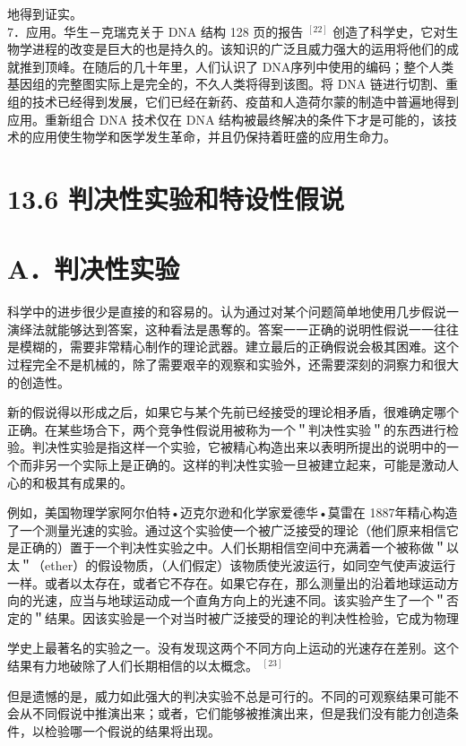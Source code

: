地得到证实。\\
7．应用。华生－克瑞克关于 DNA 结构 128 页的报告 ${ }^{[22]}$ 创造了科学史，它对生物学进程的改变是巨大的也是持久的。该知识的广泛且威力强大的运用将他们的成就推到顶峰。在随后的几十年里，人们认识了 DNA序列中使用的编码；整个人类基因组的完整图实际上是完全的，不久人类将得到该图。将 DNA 链进行切割、重组的技术已经得到发展，它们已经在新药、疫苗和人造荷尔蒙的制造中普遍地得到应用。重新组合 DNA 技术仅在 DNA 结构被最终解决的条件下才是可能的，该技术的应用使生物学和医学发生革命，并且仍保持着旺盛的应用生命力。

\section*{13.6 判决性实验和特设性假说}
\section*{A．判决性实验}
科学中的进步很少是直接的和容易的。认为通过对某个问题简单地使用几步假说一演绎法就能够达到答案，这种看法是愚奪的。答案一一正确的说明性假说一一往往是模糊的，需要非常精心制作的理论武器。建立最后的正确假说会极其困难。这个过程完全不是机械的，除了需要艰辛的观察和实验外，还需要深刻的洞察力和很大的创造性。

新的假说得以形成之后，如果它与某个先前已经接受的理论相矛盾，很难确定哪个正确。在某些场合下，两个竞争性假说用被称为一个＂判决性实验＂的东西进行检验。判决性实验是指这样一个实验，它被精心构造出来以表明所提出的说明中的一个而非另一个实际上是正确的。这样的判决性实验一旦被建立起来，可能是激动人心的和极其有成果的。

例如，美国物理学家阿尔伯特•迈克尔逊和化学家爱德华•莫雷在 1887年精心构造了一个测量光速的实验。通过这个实验使一个被广泛接受的理论（他们原来相信它是正确的）置于一个判决性实验之中。人们长期相信空间中充满着一个被称做＂以太＂（ether）的假设物质，（人们假定）该物质使光波运行，如同空气使声波运行一样。或者以太存在，或者它不存在。如果它存在，那么测量出的沿着地球运动方向的光速，应当与地球运动成一个直角方向上的光速不同。该实验产生了一个＂否定的＂结果。因该实验是一个对当时被广泛接受的理论的判决性检验，它成为物理

学史上最著名的实验之一。没有发现这两个不同方向上运动的光速存在差别。这个结果有力地破除了人们长期相信的以太概念。 ${ }^{[23]}$

但是遗憾的是，威力如此强大的判决实验不总是可行的。不同的可观察结果可能不会从不同假说中推演出来；或者，它们能够被推演出来，但是我们没有能力创造条件，以检验哪一个假说的结果将出现。

